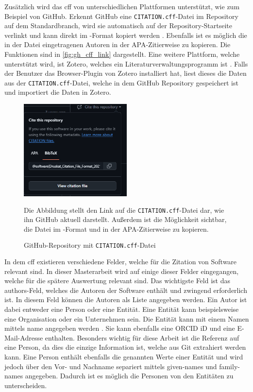 Zusätzlich wird das \gls{cff} von unterschiedlichen Plattformen unterstützt, wie zum Beispiel von GitHub.
Erkennt GitHub eine \texttt{CITATION.cff}-Datei im Repository auf dem Standardbranch, wird sie automatisch auf der Repository-Startseite verlinkt und kann direkt im -Format kopiert werden \autocites{druskat_citation_2021}{github_about_2024-2}.
Ebenfalls ist es möglich die in der Datei eingetragenen Autoren in der APA-Zitierweise zu kopieren.
Die Funktionen sind in \autoref{fig:gh_cff_link} dargestellt.
Eine weitere Plattform, welche unterstützt wird, ist Zotero, welches ein Literaturverwaltungsprogramm ist \autocites{druskat_citation_2021}{zotero_zotero_2024}.
Falls der Benutzer das Browser-Plugin von Zotero installiert hat, liest dieses die Daten aus der \texttt{CITATION.cff}-Datei, welche in dem GitHub Repository gespeichert ist und importiert die Daten in Zotero.

\begin{figure}
    \centering
    \includegraphics[width=0.5\textwidth]{bilder/GH_CFF_link.png}
    \caption{GitHub-Repository mit \texttt{CITATION.cff}-Datei}
    \label{fig:gh_cff_link}
    \small
    Die Abbildung stellt den Link auf die \texttt{CITATION.cff}-Datei dar, wie ihn GitHub aktuell darstellt.
    Außerdem ist die Möglichkeit sichtbar, die Datei im -Format und in der APA-Zitierweise zu kopieren.
\end{figure}

In dem \gls{cff} existieren verschiedene Felder, welche für die Zitation von Software relevant sind.
In dieser Masterarbeit wird auf einige dieser Felder eingegangen, welche für die spätere Auswertung relevant sind.
Das wichtigste Feld ist das \glqq authors\grqq{}-Feld, welches die Autoren der Software enthält und zwingend erforderlich ist.
In diesem Feld können die Autoren als Liste angegeben werden.
Ein Autor ist dabei entweder eine Person oder eine Entität.
Eine Entität kann beispielsweise eine Organisation oder ein Unternehmen sein.
Die Entität kann mit einem Namen mittels \glqq name\grqq{} angegeben werden \autocite{druskat_citation_2021}.
Sie kann ebenfalls eine ORCID iD und eine E-Mail-Adresse enthalten.
Besonders wichtig für diese Arbeit ist die Referenz auf eine Person, da dies die einzige Information ist, welche aus Git extrahiert werden kann.
Eine Person enthält ebenfalls die genannten Werte einer Entität und wird jedoch über den Vor- und Nachname separiert mittels \glqq given-names\grqq{} und \glqq family-names\grqq{} angegeben.
Dadurch ist es möglich die Personen von den Entitäten zu unterscheiden.

